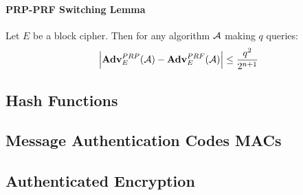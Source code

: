 \paragraph{PRP-PRF Switching Lemma}
Let $E$ be a block cipher.
Then for any algorithm $\mathcal{A}$ making $q$ queries:
$$
\Big| \mathbf{Adv}^{PRP}_{E} (\mathcal{A}) - \mathbf{Adv}^{PRF}_{E} (\mathcal{A}) \Big| \leq \frac{q^2}{2^{n+1}}
$$



\subsection{Hash Functions}


\subsection{Message Authentication Codes MACs}


\subsection{Authenticated Encryption}

